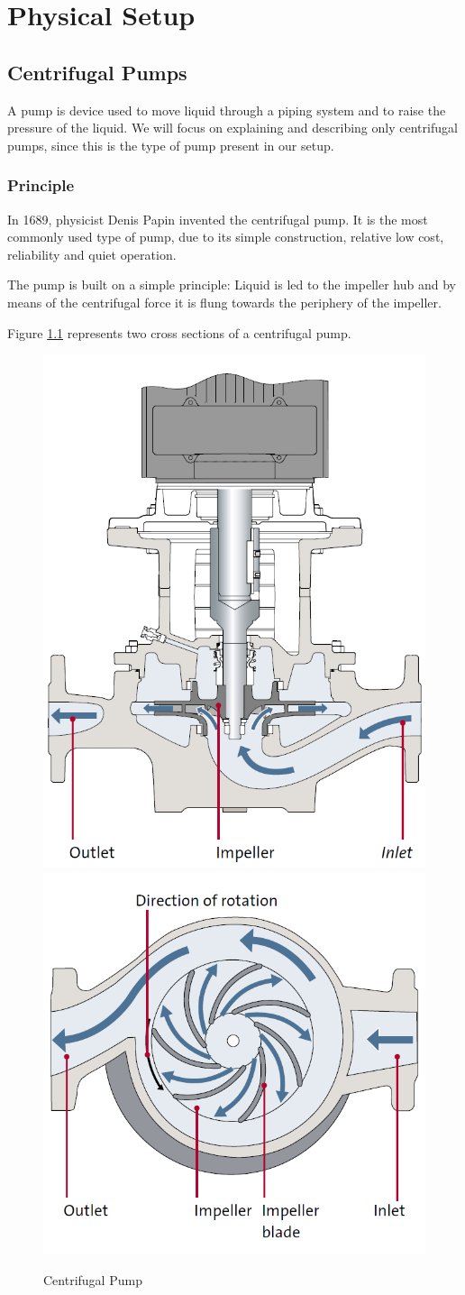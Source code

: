 \chapter{Physical Setup}\label{ch:physsetup}
\section{Centrifugal Pumps}

A pump is device used to move liquid through a piping system and to raise the pressure of the liquid. We will focus on explaining 
and describing only centrifugal pumps, since this is the type of pump present in our setup. 

\subsection{Principle}

In 1689, physicist Denis Papin invented the centrifugal pump. It is the most commonly used type of pump,
due to its simple construction, relative low cost, reliability and quiet operation.

The pump is built on a simple principle: Liquid is led to the impeller hub and by means of the centrifugal force
it is flung towards the periphery of the impeller. 

Figure \ref{fig:pump_sections} represents two cross sections of a centrifugal pump.
\begin{figure}[h]
    \centering
    \includegraphics[width=0.3\linewidth]{figures/pump_cross_section.PNG}
    \qquad
    \hfill
    \includegraphics[width=0.3\linewidth]{figures/pump_above_view.PNG}
    \caption{Centrifugal Pump}
    \label{fig:pump_sections}
\end{figure}
\newpage

